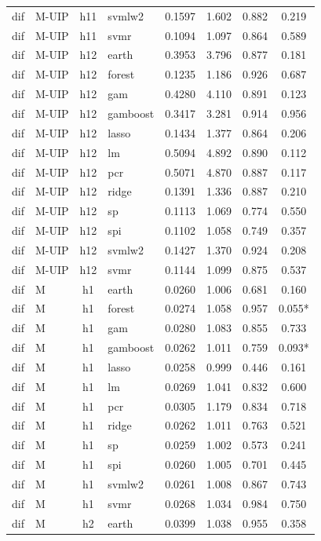 \begin{ThreePartTable}
\begin{longtable}[t]{llclcccc}
dif & M-UIP & h11 & svmlw2 & 0.1597 & 1.602 & 0.882 & 0.219\\
dif & M-UIP & h11 & svmr & 0.1094 & 1.097 & 0.864 & 0.589\\
\addlinespace
dif & M-UIP & h12 & earth & 0.3953 & 3.796 & 0.877 & 0.181\\
dif & M-UIP & h12 & forest & 0.1235 & 1.186 & 0.926 & 0.687\\
dif & M-UIP & h12 & gam & 0.4280 & 4.110 & 0.891 & 0.123\\
dif & M-UIP & h12 & gamboost & 0.3417 & 3.281 & 0.914 & 0.956\\
dif & M-UIP & h12 & lasso & 0.1434 & 1.377 & 0.864 & 0.206\\
dif & M-UIP & h12 & lm & 0.5094 & 4.892 & 0.890 & 0.112\\
dif & M-UIP & h12 & pcr & 0.5071 & 4.870 & 0.887 & 0.117\\
dif & M-UIP & h12 & ridge & 0.1391 & 1.336 & 0.887 & 0.210\\
dif & M-UIP & h12 & sp & 0.1113 & 1.069 & 0.774 & 0.550\\
dif & M-UIP & h12 & spi & 0.1102 & 1.058 & 0.749 & 0.357\\
dif & M-UIP & h12 & svmlw2 & 0.1427 & 1.370 & 0.924 & 0.208\\
dif & M-UIP & h12 & svmr & 0.1144 & 1.099 & 0.875 & 0.537\\
\addlinespace
dif & M & h1 & earth & 0.0260 & 1.006 & 0.681 & 0.160\\
dif & M & h1 & forest & 0.0274 & 1.058 & 0.957 & 0.055*\\
dif & M & h1 & gam & 0.0280 & 1.083 & 0.855 & 0.733\\
dif & M & h1 & gamboost & 0.0262 & 1.011 & 0.759 & 0.093*\\
dif & M & h1 & lasso & 0.0258 & 0.999 & 0.446 & 0.161\\
dif & M & h1 & lm & 0.0269 & 1.041 & 0.832 & 0.600\\
dif & M & h1 & pcr & 0.0305 & 1.179 & 0.834 & 0.718\\
dif & M & h1 & ridge & 0.0262 & 1.011 & 0.763 & 0.521\\
dif & M & h1 & sp & 0.0259 & 1.002 & 0.573 & 0.241\\
dif & M & h1 & spi & 0.0260 & 1.005 & 0.701 & 0.445\\
dif & M & h1 & svmlw2 & 0.0261 & 1.008 & 0.867 & 0.743\\
dif & M & h1 & svmr & 0.0268 & 1.034 & 0.984 & 0.750\\
\addlinespace
dif & M & h2 & earth & 0.0399 & 1.038 & 0.955 & 0.358\\

\end{longtable}
\end{ThreePartTable}
